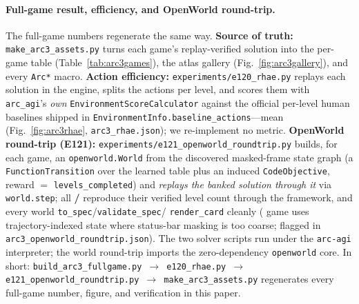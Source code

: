\documentclass[11pt]{article}
\begin{document}
\paragraph{Full-game result, efficiency, and OpenWorld round-trip.} The full-game numbers regenerate
the same way. \textbf{Source of truth:} \texttt{make\_arc3\_assets.py} turns each game's
replay-verified solution into the per-game table
(Table~\ref{tab:arc3games}), the atlas gallery (Fig.~\ref{fig:arc3gallery}), and every \texttt{Arc*}
macro. \textbf{Action efficiency:} \texttt{experiments/e120\_rhae.py} replays each solution in
the engine, splits the actions per level, and scores them with \texttt{arc\_agi}'s \emph{own}
\texttt{EnvironmentScoreCalculator} against the official per-level human baselines shipped in
\texttt{EnvironmentInfo.baseline\_actions}---mean \ArcRhaeMean{} (Fig.~\ref{fig:arc3rhae},
\texttt{arc3\_rhae.json}); we re-implement no metric. \textbf{OpenWorld round-trip (E121):}
\texttt{experiments/e121\_openworld\_roundtrip.py} builds, for each game, an \texttt{openworld.World} from
the discovered masked-frame state graph (a \texttt{FunctionTransition} over the learned table plus an
induced \texttt{CodeObjective}, reward $=$ \texttt{levels\_completed}) and \emph{replays the banked
solution through it} via \texttt{world.step}; all \textbf{\ArcOWVerified/\ArcOWTotal{}} reproduce their
verified level count through the framework, and every world \texttt{to\_spec}/\texttt{validate\_spec}/
\texttt{render\_card} cleanly (\ArcOWIndexed{} game uses trajectory-indexed state where status-bar
masking is too coarse; flagged in \texttt{arc3\_openworld\_roundtrip.json}). The two solver scripts run
under the \texttt{arc-agi} interpreter; the world round-trip imports the zero-dependency
\texttt{openworld} core. In short:
\texttt{build\_arc3\_fullgame.py $\to$ e120\_rhae.py $\to$ e121\_openworld\_roundtrip.py $\to$
make\_arc3\_assets.py} regenerates every full-game number, figure, and verification in this paper.
\end{document}
